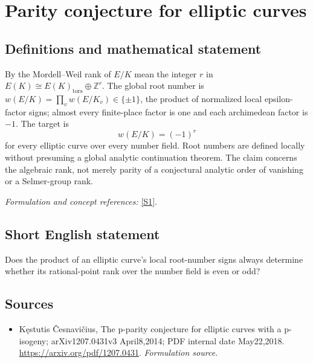 \documentclass[11pt]{article}
\begin{document}
\section*{\texorpdfstring{Parity conjecture for elliptic curves}{Parity conjecture for elliptic curves}}\label{statement}
\subsection{Definitions and mathematical statement}
By the Mordell--Weil rank of $E/K$ mean the integer $r$ in
$E(K)\cong E(K)_{\mathrm{tors}}\oplus{\mathbb{Z}}^r$. The global root number is
$w(E/K)=\prod_v w(E/K_v)\in\{\pm1\}$, the product of normalized local epsilon-factor signs; almost every finite-place factor is one and each archimedean factor is $-1$. The target is
\[
 w(E/K)=(-1)^r
\]
for every elliptic curve over every number field. Root numbers are defined locally without presuming a global analytic continuation theorem. The claim concerns the algebraic rank, not merely parity of a conjectural analytic order of vanishing or a Selmer-group rank.
\par\smallskip\textit{Formulation and concept references:} \href{https://arxiv.org/pdf/1207.0431}{[S1]}.

\subsection{Short English statement}
Does the product of an elliptic curve's local root-number signs always determine whether its rational-point rank over the number field is even or odd?
\subsection{Sources}
\begin{itemize}
\item[S1]Kęstutis Česnavičius, The p-parity conjecture for elliptic curves with a p-isogeny; arXiv1207.0431v3 April8,2014; PDF internal date May22,2018.
\url{https://arxiv.org/pdf/1207.0431}.
\textit{Formulation source.}
\end{itemize}
\end{document}
